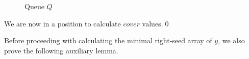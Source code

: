 \documentclass[preprint,12pt]{elsarticle}
\newcommand{\covervalue}{\ensuremath{\mathit{cover}}}
\newenvironment{example}[1][Example]{\begin{trivlist}
\item[\hskip \labelsep {\bfseries #1}]}{\end{trivlist}}
\begin{document}
\begin{example}
	\begin{figure}[!h]
	\centering
	\hspace{.1\textwidth}
        \hspace{.1\textwidth}
	\caption{Queue $Q$}
	\label{fig:queue}
	\end{figure}

We are now in a position to calculate $\covervalue$ values.\qed
\end{example}

Before proceeding with calculating the minimal right-seed array of $y$, we also prove the following auxiliary lemma.
\end{document}
